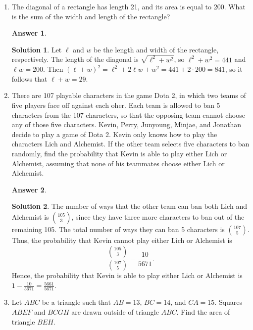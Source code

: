 \documentclass[11pt]{article}
\theoremstyle{definition}
\newtheorem*{solution}{Solution}
\newtheorem*{answer}{Answer}
\begin{document}
\begin{enumerate}
\item The diagonal of a rectangle has length 21, and its area is equal to 200. What is the sum of the width and length of the rectangle? 


\begin{answer}
\end{answer}

\begin{solution}
Let $\ell$ and $w$ be the length and width of the rectangle, respectively. The length of the diagonal is $\sqrt{\ell^2 + w^2}$, so $\ell^2 + w^2 = 441$ and $\ell w = 200$. Then $(\ell + w)^2 = \ell^2 + 2\ell w + w^2 = 441 + 2 \cdot 200 = 841$, so it follows that $\ell + w = 29$.
\end{solution}

\item There are 107 playable characters in the game Dota 2, in which two teams of five players face off against each oher. Each team is allowed to ban 5 characters from the 107 characters, so that the opposing team cannot choose any of those five characters. Kevin, Perry, Junyoung, Minjae, and Jonathan decide to play a game of Dota 2. Kevin only knows how to play the characters Lich and Alchemist. If the other team selects five characters to ban randomly, find the probability that Kevin is able to play either Lich or Alchemist, assuming that none of his teammates choose either Lich or Alchemist. 


\begin{answer}
\end{answer}

\begin{solution}
The number of ways that the other team can ban both Lich and Alchemist is $\binom{105}{3}$, since they have three more characters to ban out of the remaining 105. The total number of ways they can ban 5 characters is $\binom{107}{5}$. Thus, the probability that Kevin cannot play either Lich or Alchemist is\[\frac{\binom{105}{3}}{\binom{107}{5}} = \frac{10}{5671}.\] Hence, the probability that Kevin is able to play either Lich or Alchemist is $1 - \frac{10}{5671} = \frac{5661}{5671}$.
\end{solution}

\item Let $ABC$ be a triangle such that $AB = 13$, $BC = 14$, and $CA = 15$. Squares $ABEF$ and $BCGH$ are drawn outside of triangle $ABC$. Find the area of triangle $BEH$.


\end{enumerate}
\end{document}
